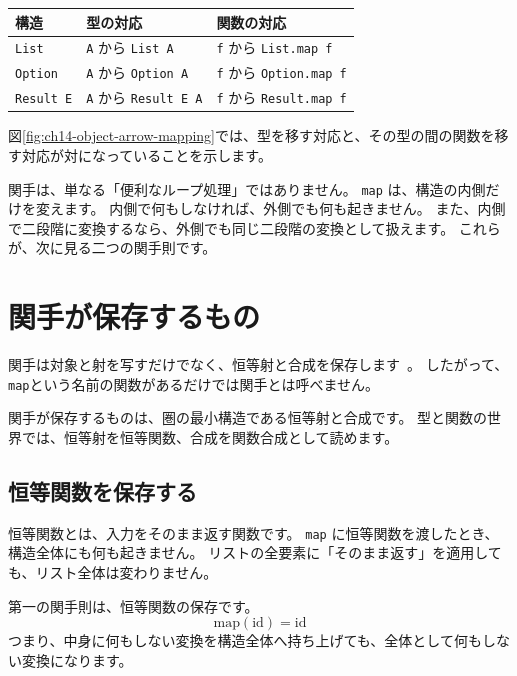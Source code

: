 \begin{center}
\begin{tabular}{lll}
\toprule
構造 & 型の対応 & 関数の対応 \\
\midrule
\texttt{List} & \texttt{A} から \texttt{List A} & \texttt{f} から \texttt{List.map f} \\
\texttt{Option} & \texttt{A} から \texttt{Option A} & \texttt{f} から \texttt{Option.map f} \\
\texttt{Result E} & \texttt{A} から \texttt{Result E A} & \texttt{f} から \texttt{Result.map f} \\
\bottomrule
\end{tabular}
\end{center}

図\ref{fig:ch14-object-arrow-mapping}では、型を移す対応と、その型の間の関数を移す対応が対になっていることを示します。


関手は、単なる「便利なループ処理」ではありません。
\texttt{map} は、構造の内側だけを変えます。
内側で何もしなければ、外側でも何も起きません。
また、内側で二段階に変換するなら、外側でも同じ二段階の変換として扱えます。
これらが、次に見る二つの関手則です。

\section{関手が保存するもの}

関手は対象と射を写すだけでなく、恒等射と合成を保存します~\cite{leinster-basic-category-theory}。
したがって、\texttt{map}という名前の関数があるだけでは関手とは呼べません。

関手が保存するものは、圏の最小構造である恒等射と合成です。
型と関数の世界では、恒等射を恒等関数、合成を関数合成として読めます。

\subsection{恒等関数を保存する}

恒等関数とは、入力をそのまま返す関数です。
\texttt{map} に恒等関数を渡したとき、構造全体にも何も起きません。
リストの全要素に「そのまま返す」を適用しても、リスト全体は変わりません。

第一の関手則は、恒等関数の保存です。
\[
  \mathrm{map}(\mathrm{id}) = \mathrm{id}
\]
つまり、中身に何もしない変換を構造全体へ持ち上げても、全体として何もしない変換になります。

